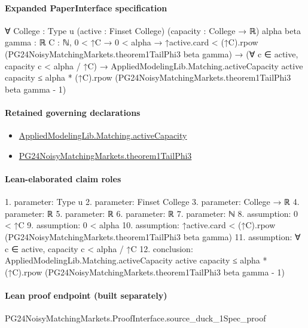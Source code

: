 \documentclass[10pt]{article}
\begin{document}
\paragraph{Expanded PaperInterface specification}
\begin{ReviewVerbatim}
∀ {College : Type u} (active : Finset College) (capacity : College → ℝ) {alpha beta gamma : ℝ} {C : ℕ},
  0 < ↑C →
    0 < alpha →
      ↑active.card < (↑C).rpow (PG24NoisyMatchingMarkets.theorem1TailPhi3 beta gamma) →
        (∀ c ∈ active, capacity c < alpha / ↑C) →
          AppliedModelingLib.Matching.activeCapacity active capacity ≤
            alpha * (↑C).rpow (PG24NoisyMatchingMarkets.theorem1TailPhi3 beta gamma - 1)
\end{ReviewVerbatim}

\paragraph{Retained governing declarations}
\begin{itemize}\raggedright
\item \hyperlink{governing-declaration-e2b85f8e7da571f3}{Applied\allowbreak{}Modeling\allowbreak{}Lib.\allowbreak{}Matching.\allowbreak{}active\allowbreak{}Capacity}
\item \hyperlink{governing-declaration-f214e532deafeb52}{PG24\allowbreak{}Noisy\allowbreak{}Matching\allowbreak{}Markets.\allowbreak{}theorem1\allowbreak{}Tail\allowbreak{}Phi3}
\end{itemize}
\paragraph{Lean-elaborated claim roles}\begin{ReviewVerbatim}
1. parameter: Type u
2. parameter: Finset College
3. parameter: College → ℝ
4. parameter: ℝ
5. parameter: ℝ
6. parameter: ℝ
7. parameter: ℕ
8. assumption: 0 < ↑C
9. assumption: 0 < alpha
10. assumption: ↑active.card < (↑C).rpow (PG24NoisyMatchingMarkets.theorem1TailPhi3 beta gamma)
11. assumption: ∀ c ∈ active, capacity c < alpha / ↑C
12. conclusion: AppliedModelingLib.Matching.activeCapacity active capacity ≤
  alpha * (↑C).rpow (PG24NoisyMatchingMarkets.theorem1TailPhi3 beta gamma - 1)
\end{ReviewVerbatim}

\paragraph{Lean proof endpoint (built separately)}\begin{ReviewVerbatim}
PG24NoisyMatchingMarkets.ProofInterface.source_duck_1Spec_proof
\end{ReviewVerbatim}
\end{document}
